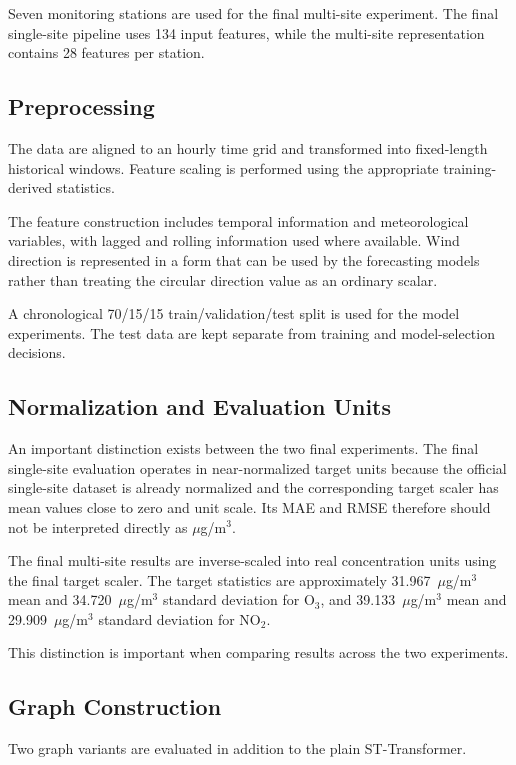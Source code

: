 \documentclass[conference]{IEEEtran}
\begin{document}
Seven monitoring stations are used for the final multi-site experiment. The final single-site
pipeline uses 134 input features, while the multi-site representation contains 28 features per
station.

\subsection{Preprocessing}

The data are aligned to an hourly time grid and transformed into fixed-length historical
windows. Feature scaling is performed using the appropriate training-derived statistics.

The feature construction includes temporal information and meteorological variables, with
lagged and rolling information used where available. Wind direction is represented in a form
that can be used by the forecasting models rather than treating the circular direction value
as an ordinary scalar.

A chronological 70/15/15 train/validation/test split is used for the model experiments. The
test data are kept separate from training and model-selection decisions.

\subsection{Normalization and Evaluation Units}

An important distinction exists between the two final experiments. The final single-site
evaluation operates in near-normalized target units because the official single-site dataset
is already normalized and the corresponding target scaler has mean values close to zero and
unit scale. Its MAE and RMSE therefore should not be interpreted directly as
$\mu$g/m$^3$.

The final multi-site results are inverse-scaled into real concentration units using the final
target scaler. The target statistics are approximately 31.967~$\mu$g/m$^3$ mean and
34.720~$\mu$g/m$^3$ standard deviation for O$_3$, and 39.133~$\mu$g/m$^3$ mean and
29.909~$\mu$g/m$^3$ standard deviation for NO$_2$.

This distinction is important when comparing results across the two experiments.

\subsection{Graph Construction}

Two graph variants are evaluated in addition to the plain ST-Transformer.
\end{document}
